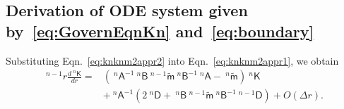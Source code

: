 \documentclass[preprint,10pt,times]{elsarticle}
\numberwithin{equation}{section}
\renewcommand{\u}[1]{\boldsymbol{#1}}
\newcommand{\usf}[1]{\u{\mathsf #1}}
\renewcommand{\>}{$\Rightarrow$}
\begin{document}
\subsection{Derivation of ODE system given by~\eqref{eq:GovernEqnKn} and~\eqref{eq:boundary}}
\label{Appen:GovernEqnKn}

Substituting Eqn.~\eqref{eq:knknm2appr2} into Eqn.~\eqref{eq:knknm2appr1}, we obtain
\begin{equation}
	\begin{aligned}
		~^{n-1}\!{r} \frac{d ~^{n}{\usf{K}}}{dr} = & \left( ~^{n}{\usf{A}}^{-1} ~^{n}{\usf{B}} ~^{n-1}\tilde{\usf{m}} ~^{n}{\usf{B}}^{-1} ~^{n}{\usf{A}} - ~^{n}\tilde{\usf{m}} \right) ~^{n}{\usf{K}} \\
		& + ~^{n}{\usf{A}}^{-1} \left( 2~^{n}{\usf{D}} + ~^{n}{\usf{B}} ~^{n-1}\tilde{\usf{m}} ~^{n}{\usf{B}}^{-1} ~^{{n-1}}{\usf{D}} \right) + O(\Delta r).
	\end{aligned}
	\label{eq:AppendKndr1}
\end{equation}
\end{document}
